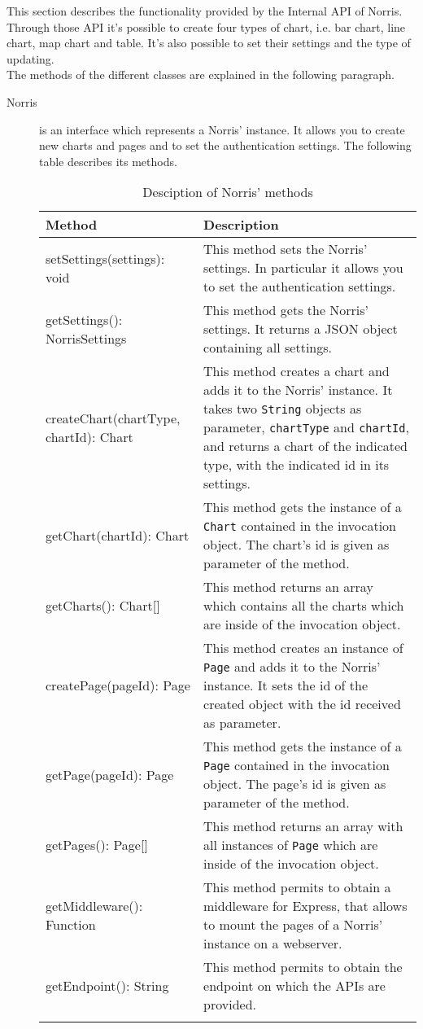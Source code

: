  \label{sec:InternalAPI}
	This section describes the functionality provided by the Internal API of Norris. Through those API it's possible to create four types of chart, i.e. bar chart, line chart, map chart and table. It's also possible to set their settings and the type of updating.\\ The methods of the different classes are explained in the following paragraph.
	\begin{description}
		\item[Norris] is an interface which represents a Norris' instance. It allows you to create new charts and pages and to set the authentication settings. The following table describes its methods.
		\begin{longtabu}{| X | X |}

			\hline
			\rowfont{\bf}
			Method &
			Description \\
			\hline \endhead
			setSettings(settings): void & This method sets the Norris' settings. In particular it allows you to set the authentication settings.
			\\ \hline
			getSettings(): NorrisSettings & This method gets the Norris' settings. It returns a JSON object containing all settings. 
			\\ \hline
			createChart(chartType, chartId): Chart & This method creates a chart and adds it to the Norris' instance. It takes two \texttt{String} objects as parameter, \texttt{chartType} and \texttt{chartId}, and returns a chart of the indicated type, with the indicated id in its settings.
			\\ \hline
			getChart(chartId): Chart & This method gets the instance of a \texttt{Chart} contained in the invocation object. The chart's id is given as parameter of the method.
			\\ \hline
			getCharts(): Chart[] & This method returns an array which contains all the charts which are inside of the invocation object.
			\\ \hline
			createPage(pageId): Page & This method creates an instance of \texttt{Page} and adds it to the Norris' instance. It sets the id of the created object with the id received as parameter.\\ \hline
			getPage(pageId): Page & This method gets the instance of a \texttt{Page} contained in the invocation object. The page's id is given as parameter of the method.
			\\ \hline
			getPages(): Page[] & This method returns an array with all instances of \texttt{Page} which are inside of the invocation object.
			\\ \hline
			getMiddleware(): Function & This method permits to obtain a middleware for Express, that allows to mount the pages of a Norris' instance on a webserver.
			\\ \hline
			getEndpoint(): String & This method permits to obtain the endpoint on which the APIs are provided.
			\\ \hline
			\caption{Desciption of Norris' methods}
		\end{longtabu}
			

\end{description}
